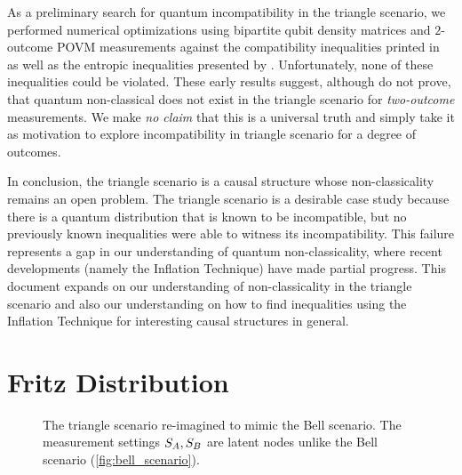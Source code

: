 \documentclass[aps, 10pt, english, twoside, pra, nofootinbib, tightenlines, longbibliography]{revtex4-1}
\begin{document}
    As a preliminary search for quantum incompatibility in the triangle scenario, we performed numerical optimizations using bipartite qubit density matrices and $2$-outcome POVM measurements against the compatibility inequalities printed in~\cite{Inflation} as well as the entropic inequalities presented by \citet{Henson_2014}. Unfortunately, none of these inequalities could be violated. These early results suggest, although do not prove, that quantum non-classical does not exist in the triangle scenario for \textit{two-outcome} measurements. We make \textit{no claim} that this is a universal truth and simply take it as motivation to explore incompatibility in triangle scenario for a degree of outcomes.


    In conclusion, the triangle scenario is a causal structure whose non-classicality remains an open problem. The triangle scenario is a desirable case study because there is a quantum distribution that is known to be incompatible, but no previously known inequalities were able to witness its incompatibility. This failure represents a gap in our understanding of quantum non-classicality, where recent developments (namely the Inflation Technique) have made partial progress. This document expands on our understanding of non-classicality in the triangle scenario and also our understanding on how to find inequalities using the Inflation Technique for interesting causal structures in general.

    \section{Fritz Distribution}
    \label{sec:fritz_distribution}
    \begin{figure}
    \begin{center}
        \scalebox{1.0}{}
        \caption{The triangle scenario re-imagined to mimic the Bell scenario. The measurement settings $S_{A},S_{B}$ are latent nodes unlike the Bell scenario (\cref{fig:bell_scenario}).}
        \label{fig:triangle_scenario_with_fritz_bell_embedded}
    \end{center}
    \end{figure}
\end{document}
